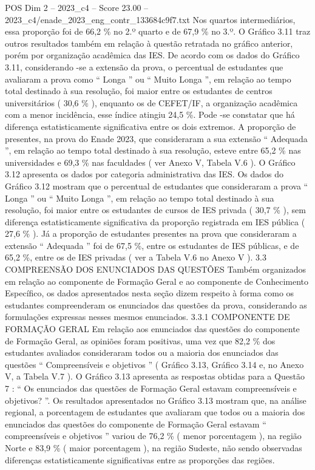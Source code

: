 \begin{textsample}{POS Dim 2 – 2023\_c4 – Score 23.00 – 2023\_c4/enade\_2023\_eng\_contr\_133684c9f7.txt}
Nos quartos intermediários, essa proporção foi de 66,2 \% no 2.º quarto e de 67,9 \% no 3.º.
O Gráfico 3.11 traz outros resultados também em relação à questão retratada no gráfico anterior, porém por organização acadêmica das IES.
De acordo com os dados do Gráfico 3.11, considerando -se a extensão da prova, o percentual de estudantes que avaliaram a prova como “ Longa ” ou “ Muito Longa ”, em relação ao tempo total destinado à sua resolução, foi maior entre os estudantes de centros universitários ( 30,6 \% ), enquanto os de CEFET/IF, a organização acadêmica com a menor incidência, esse índice atingiu 24,5 \%.
Pode -se constatar que há diferença estatisticamente significativa entre os dois extremos.
A proporção de presentes, na prova do Enade 2023, que consideraram a sua extensão “ Adequada ”, em relação ao tempo total destinado à sua resolução, esteve entre 65,2 \% nas universidades e 69,3 \% nas faculdades ( ver Anexo V, Tabela V.6 ).
O Gráfico 3.12 apresenta os dados por categoria administrativa das IES.
Os dados do Gráfico 3.12 mostram que o percentual de estudantes que consideraram a prova “ Longa ” ou “ Muito Longa ”, em relação ao tempo total destinado à sua resolução, foi maior entre os estudantes de cursos de IES privada ( 30,7 \% ), sem diferença estatisticamente significativa da proporção registrada em IES pública ( 27,6 \% ).
Já a proporção de estudantes presentes na prova que consideraram a extensão “ Adequada ” foi de 67,5 \%, entre os estudantes de IES públicas, e de 65,2 \%, entre os de IES privadas ( ver a Tabela V.6 no Anexo V ). 3.3 COMPREENSÃO DOS ENUNCIADOS DAS QUESTÕES Também organizados em relação ao componente de Formação Geral e ao componente de Conhecimento Específico, os dados apresentados nesta seção dizem respeito à forma como os estudantes compreenderam os enunciados das questões da prova, considerando as formulações expressas nesses mesmos enunciados. 3.3.1 COMPONENTE DE FORMAÇÃO GERAL Em relação aos enunciados das questões do componente de Formação Geral, as opiniões foram positivas, uma vez que 82,2 \% dos estudantes avaliados consideraram todos ou a maioria dos enunciados das questões “ Compreensíveis e objetivos ” ( Gráfico 3.13, Gráfico 3.14 e, no Anexo V, a Tabela V.7 ).
O Gráfico 3.13 apresenta as respostas obtidas para a Questão 7 : “ Os enunciados das questões de Formação Geral estavam compreensíveis e objetivos? ”.
Os resultados apresentados no Gráfico 3.13 mostram que, na análise regional, a porcentagem de estudantes que avaliaram que todos ou a maioria dos enunciados das questões do componente de Formação Geral estavam “ compreensíveis e objetivos ” variou de 76,2 \% ( menor porcentagem ), na região Norte e 83,9 \% ( maior porcentagem ), na região Sudeste, não sendo observadas diferenças estatisticamente significativas entre as proporções das regiões.

\end{textsample}
